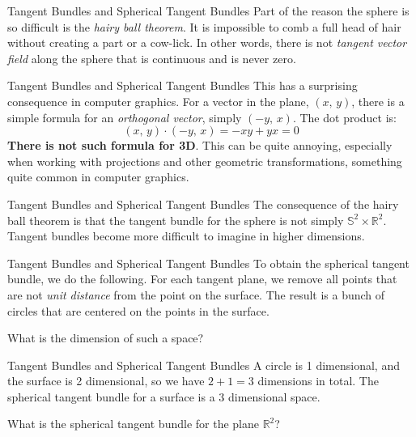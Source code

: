 \documentclass{beamer}
\begin{document}
    \begin{frame}{Tangent Bundles and Spherical Tangent Bundles}
        Part of the reason the sphere is so difficult is the
        \textit{hairy ball theorem}. It is impossible to comb a full head of
        hair without creating a part or a cow-lick. In other words, there is
        not \textit{tangent vector field} along the sphere that is continuous
        and is never zero.
    \end{frame}
    \begin{frame}{Tangent Bundles and Spherical Tangent Bundles}
        This has a surprising consequence in computer graphics. For a
        vector in the plane, $(x,\,y)$, there is a simple formula for an
        \textit{orthogonal vector}, simply $(-y,\,x)$. The dot product is:
        \begin{equation}
            (x,\,y)\cdot(-y,\,x)
            =-xy+yx
            =0
        \end{equation}
        \textbf{There is not such formula for 3D}. This can be quite annoying,
        especially when working with projections and other geometric
        transformations, something quite common in computer graphics.
    \end{frame}
    \begin{frame}{Tangent Bundles and Spherical Tangent Bundles}
        The consequence of the hairy ball theorem is that the tangent bundle
        for the sphere is not simply $\mathbb{S}^{2}\times\mathbb{R}^{2}$.
        Tangent bundles become more difficult to imagine in higher dimensions.
    \end{frame}
    \begin{frame}{Tangent Bundles and Spherical Tangent Bundles}
        To obtain the spherical tangent bundle, we do the following.
        For each tangent plane, we remove all points that are not
        \textit{unit distance} from the point on the surface. The result is a
        bunch of circles that are centered on the points in the surface.
        \par\hfill\par
        What is the dimension of such a space?
    \end{frame}
    \begin{frame}{Tangent Bundles and Spherical Tangent Bundles}
        A circle is 1 dimensional, and the surface is 2 dimensional, so we have
        $2+1=3$ dimensions in total. The spherical tangent bundle for a surface
        is a $3$ dimensional space.
        \par\hfill\par
        What is the spherical tangent bundle for the plane $\mathbb{R}^{2}$?
    \end{frame}
\end{document}

